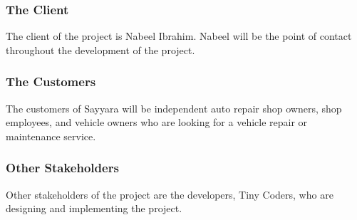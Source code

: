 \documentclass[12pt]{article}
\begin{document}
\subsubsection{The Client}
The client of the project is Nabeel Ibrahim. Nabeel will be the point of contact throughout the
development of the project.

\subsubsection{The Customers}
The customers of Sayyara will be independent auto repair shop owners, shop employees, and vehicle
owners who are looking for a vehicle repair or maintenance service.

\subsubsection{Other Stakeholders}
Other stakeholders of the project are the developers, Tiny Coders, who are designing and
implementing the project.
\end{document}
